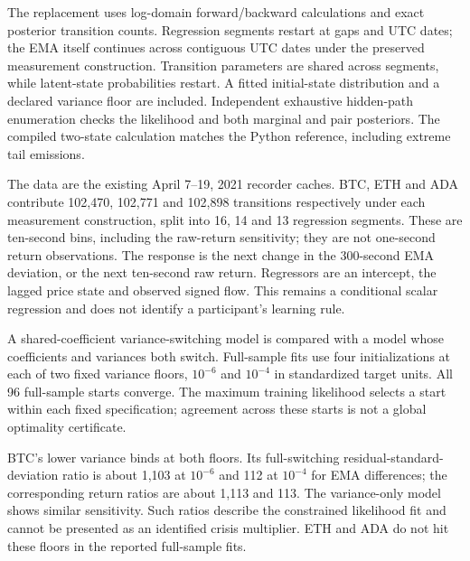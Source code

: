 The replacement uses log-domain forward/backward calculations and exact posterior transition counts. Regression segments restart at gaps and UTC dates; the EMA itself continues across contiguous UTC dates under the preserved measurement construction. Transition parameters are shared across segments, while latent-state probabilities restart. A fitted initial-state distribution and a declared variance floor are included. Independent exhaustive hidden-path enumeration checks the likelihood and both marginal and pair posteriors. The compiled two-state calculation matches the Python reference, including extreme tail emissions.

The data are the existing April 7--19, 2021 recorder caches. BTC, ETH and ADA contribute 102,470, 102,771 and 102,898 transitions respectively under each measurement construction, split into 16, 14 and 13 regression segments. These are ten-second bins, including the raw-return sensitivity; they are not one-second return observations. The response is the next change in the 300-second EMA deviation, or the next ten-second raw return. Regressors are an intercept, the lagged price state and observed signed flow. This remains a conditional scalar regression and does not identify a participant's learning rule.

A shared-coefficient variance-switching model is compared with a model whose coefficients and variances both switch. Full-sample fits use four initializations at each of two fixed variance floors, $10^{-6}$ and $10^{-4}$ in standardized target units. All 96 full-sample starts converge. The maximum training likelihood selects a start within each fixed specification; agreement across these starts is not a global optimality certificate.

BTC's lower variance binds at both floors. Its full-switching residual-standard-deviation ratio is about 1,103 at $10^{-6}$ and 112 at $10^{-4}$ for EMA differences; the corresponding return ratios are about 1,113 and 113. The variance-only model shows similar sensitivity. Such ratios describe the constrained likelihood fit and cannot be presented as an identified crisis multiplier. ETH and ADA do not hit these floors in the reported full-sample fits.

